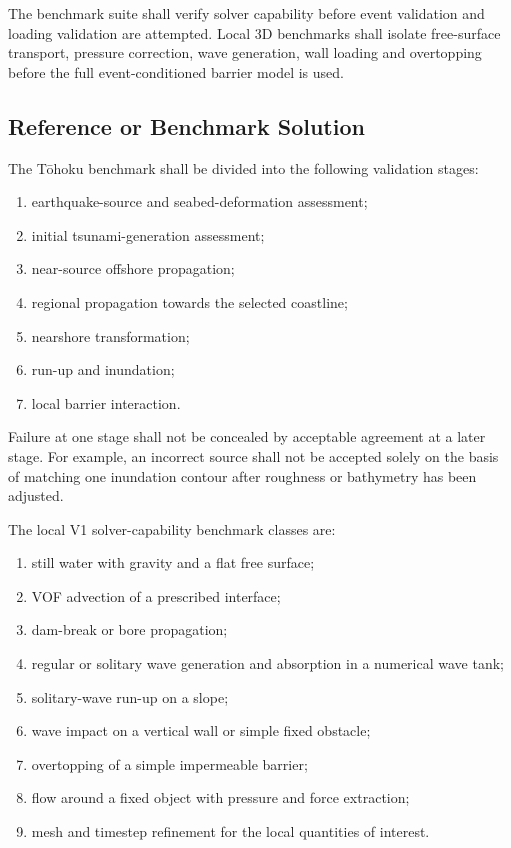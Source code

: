 
The benchmark suite shall verify solver capability before event
validation and loading validation are attempted. Local 3D benchmarks
shall isolate free-surface transport, pressure correction, wave
generation, wall loading and overtopping before the full
event-conditioned barrier model is used.

\subsection{Reference or Benchmark Solution}
\label{sec:res-ver-bmk-reference-benchmark-solution}


The Tōhoku benchmark shall be divided into the following validation
stages:

\begin{enumerate}
  \item earthquake-source and seabed-deformation assessment;
  \item initial tsunami-generation assessment;
  \item near-source offshore propagation;
  \item regional propagation towards the selected coastline;
  \item nearshore transformation;
  \item run-up and inundation;
  \item local barrier interaction.
\end{enumerate}

Failure at one stage shall not be concealed by acceptable agreement at
a later stage. For example, an incorrect source shall not be accepted
solely on the basis of matching one inundation contour after roughness
or bathymetry has been adjusted.

The local V1 solver-capability benchmark classes are:

\begin{enumerate}
  \item still water with gravity and a flat free surface;
  \item VOF advection of a prescribed interface;
  \item dam-break or bore propagation;
  \item regular or solitary wave generation and absorption in a
    numerical wave tank;
  \item solitary-wave run-up on a slope;
  \item wave impact on a vertical wall or simple fixed obstacle;
  \item overtopping of a simple impermeable barrier;
  \item flow around a fixed object with pressure and force extraction;
  \item mesh and timestep refinement for the local quantities of
    interest.
\end{enumerate}

